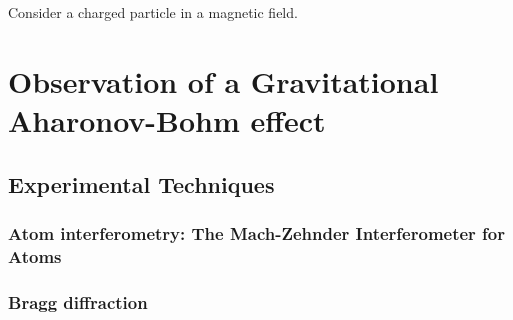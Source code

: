 \documentclass{article}
\theoremstyle{definition}
\begin{document}
Consider a charged particle in a magnetic field. 



\section{Observation of a Gravitational Aharonov-Bohm effect}




\subsection{Experimental Techniques}


\subsubsection{Atom interferometry: The Mach-Zehnder Interferometer for Atoms}

\subsubsection{Bragg diffraction}
\end{document}
